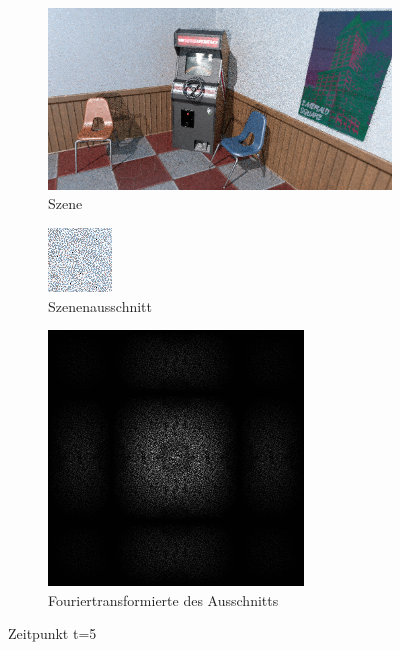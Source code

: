 \begin{figure}[H]
    \begin{subfigure}{\textwidth}   
        \centering \includegraphics[scale=.25]{content/TemporalerAlg/Bilder/Sorting/Screenshots/seed_debug_9.0_selection.png}
        \caption{Szene}
        \label{fig:Nur_Sorting_Szene_t7}
    \end{subfigure}
    \begin{subfigure}{0.5\textwidth}
        \centering\includegraphics[width=0.4\linewidth]{content/TemporalerAlg/Bilder/Sorting/Screenshots/seed_debug_9.0_ausschnitt.png} 
        \caption{Szenenausschnitt}
        \label{fig:Nur_Sorting_ausschnitt_t7}
    \end{subfigure}
    \begin{subfigure}{0.5\textwidth}
        \centering\includegraphics[width=0.4\linewidth]{content/TemporalerAlg/Bilder/Sorting/Screenshots/Spektren/seed_debug_9.0_ausschnitt.png}
        \caption{Fouriertransformierte des Ausschnitts}
        \label{fig:Nur_Sorting_Fouriertransformierte_t7}
    \end{subfigure}
        \caption{Zeitpunkt t=5}
        \label{fig:Nur_Sorting_Verlauf_t7}
\end{figure}